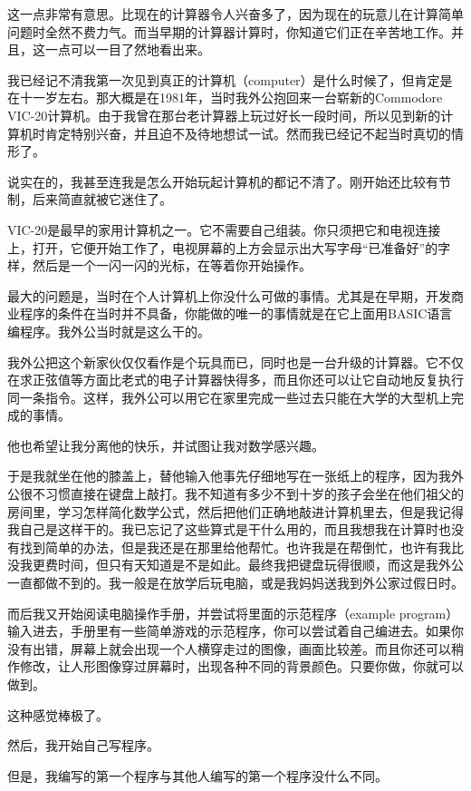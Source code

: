 这一点非常有意思。比现在的计算器令人兴奋多了，因为现在的玩意儿在计算简单问题时全然不费力气。而当早期的计算器计算时，你知道它们正在辛苦地工作。并且，这一点可以一目了然地看出来。

我已经记不清我第一次见到真正的计算机（computer）是什么时候了，但肯定是在十一岁左右。那大概是在1981年，当时我外公抱回来一台崭新的Commodore VIC-20计算机。由于我曾在那台老计算器上玩过好长一段时间，所以见到新的计算机时肯定特别兴奋，并且迫不及待地想试一试。然而我已经记不起当时真切的情形了。

说实在的，我甚至连我是怎么开始玩起计算机的都记不清了。刚开始还比较有节制，后来简直就被它迷住了。

VIC-20是最早的家用计算机之一。它不需要自己组装。你只须把它和电视连接上，打开，它便开始工作了，电视屏幕的上方会显示出大写字母“已准备好”的字样，然后是一个一闪一闪的光标，在等着你开始操作。

最大的问题是，当时在个人计算机上你没什么可做的事情。尤其是在早期，开发商业程序的条件在当时并不具备，你能做的唯一的事情就是在它上面用BASIC语言编程序。我外公当时就是这么干的。

我外公把这个新家伙仅仅看作是个玩具而已，同时也是一台升级的计算器。它不仅在求正弦值等方面比老式的电子计算器快得多，而且你还可以让它自动地反复执行同一条指令。这样，我外公可以用它在家里完成一些过去只能在大学的大型机上完成的事情。

他也希望让我分离他的快乐，并试图让我对数学感兴趣。

于是我就坐在他的膝盖上，替他输入他事先仔细地写在一张纸上的程序，因为我外公很不习惯直接在键盘上敲打。我不知道有多少不到十岁的孩子会坐在他们祖父的房间里，学习怎样简化数学公式，然后把他们正确地敲进计算机里去，但是我记得我自己是这样干的。我已忘记了这些算式是干什么用的，而且我想我在计算时也没有找到简单的办法，但是我还是在那里给他帮忙。也许我是在帮倒忙，也许有我比没我更费时间，但只有天知道是不是如此。最终我把键盘玩得很顺，而这是我外公一直都做不到的。我一般是在放学后玩电脑，或是我妈妈送我到外公家过假日时。

而后我又开始阅读电脑操作手册，并尝试将里面的示范程序（example program）输入进去，手册里有一些简单游戏的示范程序，你可以尝试着自己编进去。如果你没有出错，屏幕上就会出现一个人横穿走过的图像，画面比较差。而且你还可以稍作修改，让人形图像穿过屏幕时，出现各种不同的背景颜色。只要你做，你就可以做到。

这种感觉棒极了。

然后，我开始自己写程序。

但是，我编写的第一个程序与其他人编写的第一个程序没什么不同。


